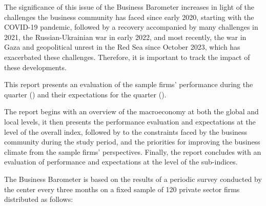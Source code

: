 \noindent
{\fontsize{10}{13}\selectfont
The significance of this issue of the Business Barometer increases in light of the challenges the business community has faced since early 2020, starting with the COVID-19 pandemic, followed by a recovery accompanied by many challenges in 2021, the Russian-Ukrainian war in early 2022, and most recently, the war in Gaza and geopolitical unrest in the Red Sea since October 2023, which has exacerbated these challenges. Therefore, it is important to track the impact of these developments.

\vspace{0.8em}

This report presents an evaluation of the sample firms’ performance during the quarter (\CurrentQuarterText) and their expectations for the quarter (\NextQuarterText).

\vspace{0.8em}

The report begins with an overview of the macroeconomy at both the global and local levels, it then presents the performance evaluation and expectations at the level of the overall index, followed by to the constraints faced by the business community during the study period, and the priorities for improving the business climate from the sample firms’ perspectives. Finally, the report concludes with an evaluation of performance and expectations at the level of the sub-indices.

\vspace{0.8em}

The Business Barometer is based on the results of a periodic survey conducted by the center every three months on a fixed sample of 120 private sector firms distributed as follows:
}

\clearpage




